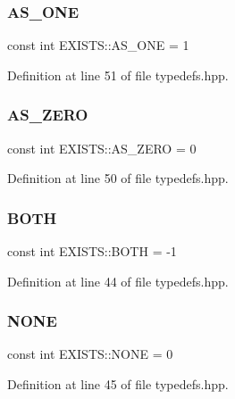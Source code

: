 \subsubsection{\texorpdfstring{A\+S\+\_\+\+O\+NE}{AS\_ONE}}
{\footnotesize\ttfamily const int E\+X\+I\+S\+T\+S\+::\+A\+S\+\_\+\+O\+NE = 1}



Definition at line 51 of file typedefs.\+hpp.

\mbox{\label{namespace_e_x_i_s_t_s_a03d550dd049f50f852b8fb4caa48238a}} 
\subsubsection{\texorpdfstring{A\+S\+\_\+\+Z\+E\+RO}{AS\_ZERO}}
{\footnotesize\ttfamily const int E\+X\+I\+S\+T\+S\+::\+A\+S\+\_\+\+Z\+E\+RO = 0}



Definition at line 50 of file typedefs.\+hpp.

\mbox{\label{namespace_e_x_i_s_t_s_a256db431572e1e7f26f8dfa6c9cae9bd}} 
\subsubsection{\texorpdfstring{B\+O\+TH}{BOTH}}
{\footnotesize\ttfamily const int E\+X\+I\+S\+T\+S\+::\+B\+O\+TH = -\/1}



Definition at line 44 of file typedefs.\+hpp.

\mbox{\label{namespace_e_x_i_s_t_s_a2f75d813424980b47f3e7c9608fb8416}} 
\subsubsection{\texorpdfstring{N\+O\+NE}{NONE}}
{\footnotesize\ttfamily const int E\+X\+I\+S\+T\+S\+::\+N\+O\+NE = 0}



Definition at line 45 of file typedefs.\+hpp.

